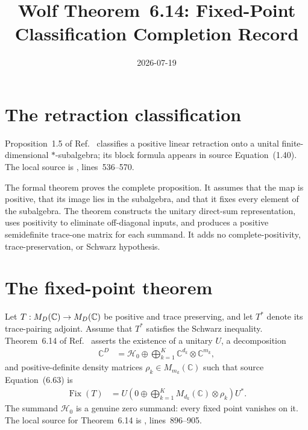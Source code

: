 \documentclass{article}
\title{Wolf Theorem~6.14: Fixed-Point Classification Completion Record}
\author{}
\date{2026-07-19}
\begin{document}
\maketitle
{}

\section{The retraction classification}

Proposition~1.5 of Ref.~\cite{Wolf2012Quantum} classifies a positive linear
retraction onto a unital finite-dimensional $*$-subalgebra; its block formula
appears in source Equation~(1.40). The local source is
,
lines~536--570.

The formal theorem
 proves
the complete proposition. It assumes that the map is positive, that its image
lies in the subalgebra, and that it fixes every element of the subalgebra. The
theorem constructs the unitary direct-sum representation, uses positivity to
eliminate off-diagonal inputs, and produces a positive semidefinite trace-one
matrix for each summand. It adds no complete-positivity, trace-preservation, or
Schwarz hypothesis.

\section{The fixed-point theorem}

Let $T:M_{D}(\mathbb{C})\to M_{D}(\mathbb{C})$ be positive and trace preserving, and let $T^*$ denote
its trace-pairing adjoint. Assume that $T^*$ satisfies the Schwarz inequality.
Theorem~6.14 of Ref.~\cite{Wolf2012Quantum} asserts the existence of a unitary
$U$, a decomposition
\begin{align}
  \mathbb C^D
    &=\mathcal H_0
      \oplus\bigoplus_{k=1}^K
      \mathbb C^{d_k}\otimes\mathbb C^{m_k},
  \label{eq:wolf_theorem6_14_fixed_point_projection_gap_source_decomposition}
\end{align}
and positive-definite density matrices
$\rho_k\in M_{m_k}(\mathbb C)$ such that source Equation~(6.63) is
\begin{align}
  \operatorname{Fix}(T)
    &=U\left(0\oplus\bigoplus_{k=1}^K
      M_{d_k}(\mathbb C)\otimes\rho_k\right)U^*.
  \label{eq:wolf_theorem6_14_fixed_point_projection_gap_source_fixed_space}
\end{align}
The summand $\mathcal H_0$ is a genuine zero summand: every fixed point
vanishes on it. The local source for Theorem~6.14 is
, lines~896--905.
\end{document}
